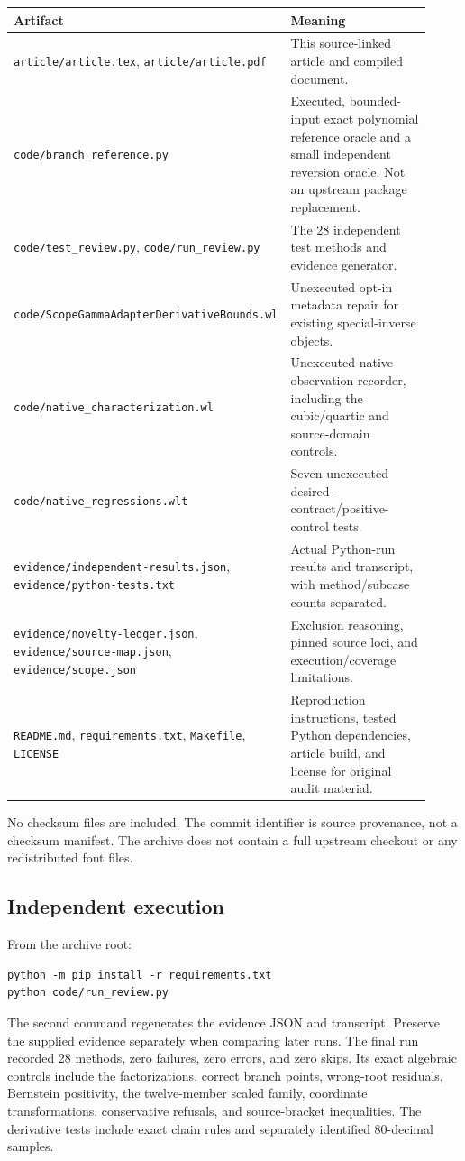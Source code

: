 \documentclass[11pt,letterpaper]{article}
\newcommand{\code}[1]{{\small\nolinkurl{#1}}}
\begin{document}
\begin{longtable}{@{}P{0.46\linewidth}P{0.46\linewidth}@{}}
\toprule
Artifact & Meaning\\\midrule\endhead
\code{article/article.tex}, \code{article/article.pdf} & This source-linked article and compiled document.\\
\code{code/branch_reference.py} & Executed, bounded-input exact polynomial reference oracle and a small independent reversion oracle. Not an upstream package replacement.\\
\code{code/test_review.py}, \code{code/run_review.py} & The 28 independent test methods and evidence generator.\\
\code{code/ScopeGammaAdapterDerivativeBounds.wl} & Unexecuted opt-in metadata repair for existing special-inverse objects.\\
\code{code/native_characterization.wl} & Unexecuted native observation recorder, including the cubic/quartic and source-domain controls.\\
\code{code/native_regressions.wlt} & Seven unexecuted desired-contract/positive-control tests.\\
\code{evidence/independent-results.json}, \code{evidence/python-tests.txt} & Actual Python-run results and transcript, with method/subcase counts separated.\\
\code{evidence/novelty-ledger.json}, \code{evidence/source-map.json}, \code{evidence/scope.json} & Exclusion reasoning, pinned source loci, and execution/coverage limitations.\\
\code{README.md}, \code{requirements.txt}, \code{Makefile}, \code{LICENSE} & Reproduction instructions, tested Python dependencies, article build, and license for original audit material.\\
\bottomrule
\end{longtable}

No checksum files are included. The commit identifier is source provenance, not a checksum manifest. The archive does not contain a full upstream checkout or any redistributed font files.

\subsection{Independent execution}

From the archive root:
\begin{lstlisting}
python -m pip install -r requirements.txt
python code/run_review.py
\end{lstlisting}
The second command regenerates the evidence JSON and transcript. Preserve the supplied evidence separately when comparing later runs. The final run recorded 28 methods, zero failures, zero errors, and zero skips. Its exact algebraic controls include the factorizations, correct branch points, wrong-root residuals, Bernstein positivity, the twelve-member scaled family, coordinate transformations, conservative refusals, and source-bracket inequalities. The derivative tests include exact chain rules and separately identified 80-decimal samples.
\end{document}
